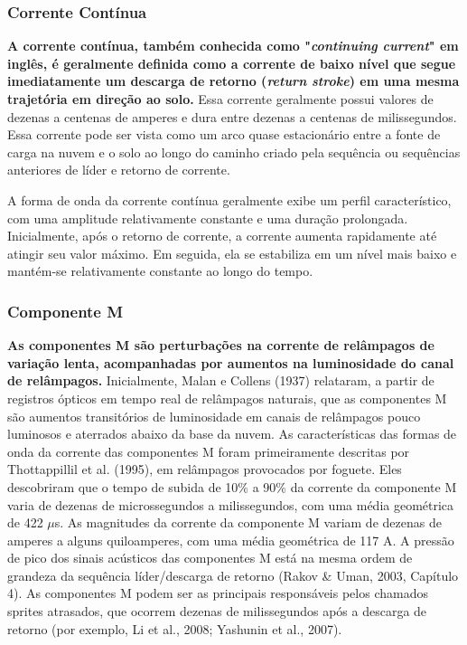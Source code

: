 \documentclass[a4paper, 12pt, onecolumn,singlespacing]{article}
\begin{document}
	\subsubsection{Corrente Contínua}
	
		\textbf{A corrente contínua, também conhecida como "\textit{continuing current}" em inglês, é geralmente definida como a corrente de baixo nível que segue imediatamente um descarga de retorno (\textit{return stroke}) em uma mesma trajetória em direção ao solo.} Essa corrente geralmente possui valores de dezenas a centenas de amperes e dura entre dezenas a centenas de milissegundos. Essa corrente pode ser vista como um arco quase estacionário entre a fonte de carga na nuvem e o solo ao longo do caminho criado pela sequência ou sequências anteriores de líder e retorno de corrente.
		
		A forma de onda da corrente contínua geralmente exibe um perfil característico, com uma amplitude relativamente constante e uma duração prolongada. Inicialmente, após o retorno de corrente, a corrente aumenta rapidamente até atingir seu valor máximo. Em seguida, ela se estabiliza em um nível mais baixo e mantém-se relativamente constante ao longo do tempo. 
	
	\subsubsection{Componente M}
		\textbf{As componentes M são perturbações na corrente de relâmpagos de variação lenta, acompanhadas por aumentos na luminosidade do canal de relâmpagos.} Inicialmente, Malan e Collens (1937) relataram, a partir de registros ópticos em tempo real de relâmpagos naturais, que as componentes M são aumentos transitórios de luminosidade em canais de relâmpagos pouco luminosos e aterrados abaixo da base da nuvem. As características das formas de onda da corrente das componentes M foram primeiramente descritas por Thottappillil et al. (1995), em relâmpagos provocados por foguete. Eles descobriram que o tempo de subida de 10\% a 90\% da corrente da componente M varia de dezenas de microssegundos a milissegundos, com uma média geométrica de 422 $\mu$s. As magnitudes da corrente da componente M variam de dezenas de amperes a alguns quiloamperes, com uma média geométrica de 117 A. A pressão de pico dos sinais acústicos das componentes M está na mesma ordem de grandeza da sequência líder/descarga de retorno (Rakov \& Uman, 2003, Capítulo 4). As componentes M podem ser as principais responsáveis pelos chamados sprites atrasados, que ocorrem dezenas de milissegundos após a descarga de retorno (por exemplo, Li et al., 2008; Yashunin et al., 2007).
	
\end{document}
